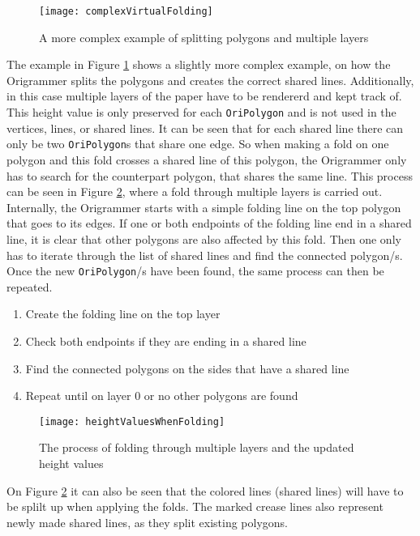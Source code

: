 \newpage

 \begin{figure}[htbp]
	\centering
	\texttt{[image: complexVirtualFolding]}
	\caption{A more complex example of splitting polygons and multiple layers}
	\label{fig:complexVirtualFolding}
\end{figure}

\noindent The example in Figure \ref{fig:complexVirtualFolding} shows a slightly more complex example, on how the Origrammer splits the polygons and creates the correct shared lines. Additionally, in this case multiple layers of the paper have to be rendererd and kept track of. This height value is only preserved for each \texttt{OriPolygon} and is not used in the vertices, lines, or shared lines. It can be seen that for each shared line there can only be two \texttt{OriPolygon}s that share one edge. So when making a fold on one polygon and this fold crosses a shared line of this polygon, the Origrammer only has to search for the counterpart polygon, that shares the same line. This process can be seen in Figure \ref{fig:heightValuesWhenFolding}, where a fold through multiple layers is carried out. Internally, the Origrammer starts with a simple folding line on the top polygon that goes to its edges. If one or both endpoints of the folding line end in a shared line, it is clear that other polygons are also affected by this fold. Then one only has to iterate through the list of shared lines and find the connected polygon/s. Once the new \texttt{OriPolygon}/s have been found, the same process can then be repeated.


\begin{enumerate}
\item Create the folding line on the top layer
\item Check both endpoints if they are ending in a shared line
\item Find the connected polygons on the sides that have a shared line
\item Repeat until on layer 0 or no other polygons are found
\end{enumerate}

\begin{figure}[htbp]
	\centering
	\texttt{[image: heightValuesWhenFolding]}
	\caption{The process of folding through multiple layers and the updated height values}
	\label{fig:heightValuesWhenFolding}
\end{figure}

\noindent On Figure \ref{fig:heightValuesWhenFolding} it can also be seen that the colored lines (shared lines) will have to be splilt up when applying the folds. The marked crease lines also represent newly made shared lines, as they split existing polygons.

